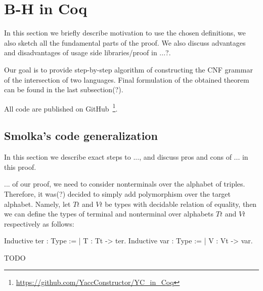 \section{B-H in Coq}


In this section we briefly describe motivation to use the chosen definitions, we also sketch all the fundamental parts of the proof. We also discuss advantages and disadvantages of usage side libraries/proof in ...?.

Our goal is to provide step-by-step algorithm of constructing the CNF grammar of the intersection of two languages. Final formulation of the obtained theorem can be found in the last subsection(?). 

All code are published on GitHub~\footnote{\url{https://github.com/YaccConstructor/YC\_in\_Coq}}.
   
\subsection{ Smolka's code generalization}

In this section we describe exact steps to ..., and discuss pros and cons of ... in this proof. 



... of our proof, we need to consider nonterminals over the alphabet of triples. Therefore, it was(?) decided to simply add polymorphism over the target alphabet. Namely, let $Tt$ and $Vt$ be types with decidable relation of equality, then we can define the types of terminal and nonterminal over alphabets $Tt$ and $Vt$ respectively as follows:

\begin{listing}[h]
	\begin{pyglist}[language=coq, numbers=none, numbersep=5pt]
  Inductive ter : Type := | T : Tt -> ter.
  Inductive var : Type := | V : Vt -> var.
	\end{pyglist}
	\caption{TODO}
	\label{lst:verbments1}
\end{listing}

